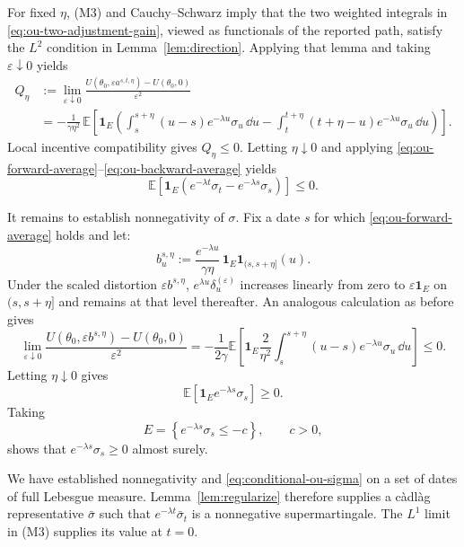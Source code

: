 \documentclass[12pt]{article}
\newcommand{\E}{\mathbb{E}}
\begin{document}
For fixed \(\eta\), 
\textnormal{(M3)} and Cauchy--Schwarz imply that the two weighted
integrals in \eqref{eq:ou-two-adjustment-gain}, viewed as functionals
of the reported path, satisfy the \(L^2\) condition in 
Lemma~\ref{lem:direction}. Applying that lemma and taking \(\varepsilon\downarrow0\) yields
\begin{align*}
Q_\eta
&:=
\lim_{\varepsilon\downarrow0}
\frac{
  U(\theta_0,\varepsilon a^{s,t,\eta})-U(\theta_0,0)
}{\varepsilon^2}\\
&=
-\frac{1}{\gamma\eta^2}\,
\E\!\left[
\mathbf 1_E\left(
  \int_s^{s+\eta}
    (u-s)e^{-\lambda u}\sigma_u\,\dd u
  -
  \int_t^{t+\eta}
    (t+\eta-u)e^{-\lambda u}\sigma_u\,\dd u
\right)\right].
\end{align*}
Local incentive compatibility gives \(Q_\eta\leq0\). Letting
\(\eta\downarrow0\) and applying
\eqref{eq:ou-forward-average}--\eqref{eq:ou-backward-average} yields
\begin{equation}\label{eq:conditional-ou-sigma}
  \E\!\left[
    \mathbf 1_E
    \left(
      e^{-\lambda t}\sigma_t-e^{-\lambda s}\sigma_s
    \right)
  \right]
  \leq0.
\end{equation}

It remains to establish nonnegativity of $\sigma$. Fix a date \(s\) for which
\eqref{eq:ou-forward-average} holds and let:
\begin{equation}\label{eq:ou-single-adjustment}
  b_u^{s,\eta}
  :=
  \frac{e^{-\lambda u}}{\gamma\eta}\,
  \mathbf 1_E\mathbf 1_{(s,s+\eta]}(u).
\end{equation}
Under the scaled distortion \(\varepsilon b^{s,\eta}\),
\(e^{\lambda u}\delta_u^{(\varepsilon)}\) increases linearly from zero
to \(\varepsilon\mathbf 1_E\) on \((s,s+\eta]\) and remains at that
level thereafter. An analogous calculation as before gives
\[
  \lim_{\varepsilon\downarrow0}
  \frac{
    U(\theta_0,\varepsilon b^{s,\eta})-U(\theta_0,0)
  }{\varepsilon^2}
  =
  -\frac{1}{2\gamma}
  \E\!\left[
    \mathbf 1_E
    \frac{2}{\eta^2}\int_s^{s+\eta}
      (u-s)e^{-\lambda u}\sigma_u\,\dd u
  \right]
  \leq0.
\]
Letting \(\eta\downarrow0\) gives
\[
  \E\!\left[
    \mathbf 1_Ee^{-\lambda s}\sigma_s
  \right]\geq0.
\]
Taking
\[
  E=\left\{e^{-\lambda s}\sigma_s\leq-c\right\},
  \qquad c>0,
\]
shows that \(e^{-\lambda s}\sigma_s\geq0\) almost surely.

We have established nonnegativity and
\eqref{eq:conditional-ou-sigma} on a set of dates of full Lebesgue
measure. Lemma~\ref{lem:regularize} therefore supplies a c\`adl\`ag
representative \(\bar\sigma\) such that
\(e^{-\lambda t}\bar\sigma_t\) is a nonnegative supermartingale. The
\(L^1\) limit in
\textnormal{(M3)} supplies its value
at $t=0$.
\end{document}
